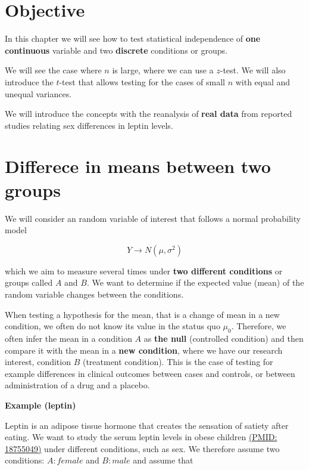 \documentclass[
]{book}
\begin{document}
\hypertarget{objective-11}{%
\section{Objective}\label{objective-11}}

In this chapter we will see how to test statistical independence of \textbf{one continuous} variable and two \textbf{discrete} conditions or groups.

We will see the case where \(n\) is large, where we can use a \(z\)-test. We will also introduce the \(t\)-test that allows testing for the cases of small \(n\) with equal and unequal variances.

We will introduce the concepts with the reanalysis of \textbf{real data} from reported studies relating sex differences in leptin levels.

\hypertarget{differece-in-means-between-two-groups}{%
\section{Differece in means between two groups}\label{differece-in-means-between-two-groups}}

We will consider an random variable of interest that follows a normal probability model

\[ Y \rightarrow N(\mu, \sigma^2)\]

which we aim to measure several times under \textbf{two different conditions} or groups called \(A\) and \(B\). We want to determine if the expected value (mean) of the random variable changes between the conditions.

When testing a hypothesis for the mean, that is a change of mean in a new condition, we often do not know its value in the status quo \(\mu_0\). Therefore, we often infer the mean in a condition \(A\) as \textbf{the null} (controlled condition) and then compare it with the mean in a \textbf{new condition}, where we have our research interest, condition \(B\) (treatment condition). This is the case of testing for example differences in clinical outcomes between cases and controls, or between administration of a drug and a placebo.

\textbf{Example (leptin)}

Leptin is an adipose tissue hormone that creates the sensation of satiety after eating. We want to study the serum leptin levels in obese children \href{https://pubmed.ncbi.nlm.nih.gov/18755049/}{(PMID: 18755049)} under different conditions, such as sex. We therefore assume two conditions: \(A:female\) and \(B:male\) and assume that
\end{document}

